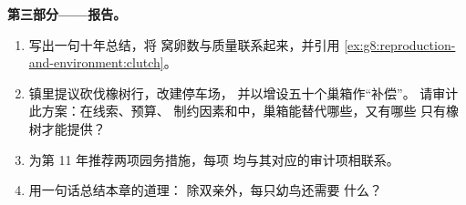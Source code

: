 \begin{problem}
\medskip\noindent\textbf{第三部分——报告。}
\begin{enumerate}[resume]
  \item 写出一句十年总结，将
        窝卵数与质量联系起来，并引用
        \cref{ex:g8:reproduction-and-environment:clutch}。
  \item 镇里提议砍伐橡树行，改建停车场，
        并以增设五十个巢箱作“补偿”。
        请审计此方案：在线索、预算、
        制约因素和中，巢箱能替代哪些，又有哪些
        只有橡树才能提供？
  \item 为第 11 年推荐两项园务措施，每项
        均与其对应的审计项相联系。
  \item 用一句话总结本章的道理：
        除双亲外，每只幼鸟还需要
        什么？
\end{enumerate}
\end{problem}
